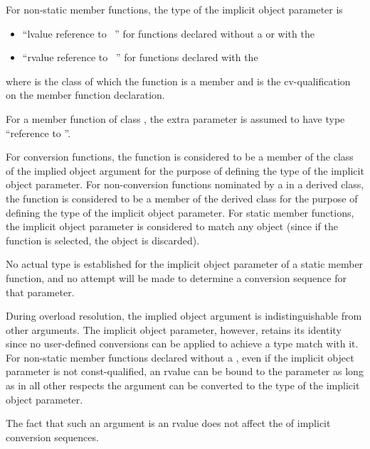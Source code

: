 \pnum
For non-static member functions, the type of the implicit object
parameter is
\begin{itemize}
\item ``lvalue reference to \cv{}~'' for functions declared
without a  or with the
\tcode{\&} 
\item ``rvalue reference to \cv{}~'' for functions declared with the
\tcode{\&\&} 
\end{itemize}
where
is the class of which the function is a member and
\cv{}
is the cv-qualification on the
member function declaration.
\begin{example}
For a
member
function of class
,
the extra parameter is assumed to have type
``reference to
''.
\end{example}
For conversion functions, the function is considered to be a member of the
class of the implied object argument for the purpose of defining the
type of the implicit object parameter.
For non-conversion functions
nominated by a 
in a derived class, the function is
considered to be a member of the derived class for the purpose of defining
the type of the implicit object parameter.
For static member functions, the implicit object parameter is considered
to match any object (since if the function is selected, the object is
discarded).
\begin{note}
No actual type is established for the implicit object parameter
of a static member function, and no attempt will be made to determine a
conversion sequence for that parameter.
\end{note}

\pnum
{}%
During overload resolution, the implied object argument is
indistinguishable from other arguments.
The implicit object
parameter, however, retains its identity since
no user-defined conversions can be applied to achieve a type
match with it.
%
For non-static member functions declared without a ,
even if the implicit object parameter is not const-qualified,
an rvalue can be bound to the parameter
as long as in all other respects the argument can be
converted to the type of the implicit object parameter.
\begin{note}
The fact that such an argument is an rvalue does not
affect the  of implicit conversion sequences.
\end{note}


